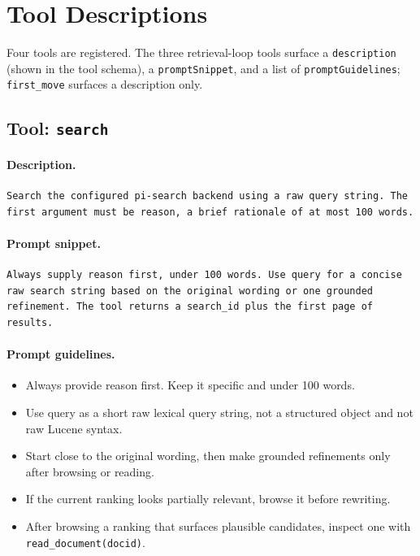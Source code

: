 \section{Tool Descriptions}
\label{sec:tool-descriptions}

Four tools are registered. The three retrieval-loop tools surface a
\texttt{description} (shown in the tool schema), a \texttt{promptSnippet}, and a
list of \texttt{promptGuidelines}; \texttt{first\_move} surfaces a description
only.

\subsection{Tool: {\tt search}}
\label{tool:search}

\paragraph{Description.}
\begin{verbatim}
Search the configured pi-search backend using a raw query string. The
first argument must be reason, a brief rationale of at most 100 words.
\end{verbatim}

\paragraph{Prompt snippet.}
\begin{verbatim}
Always supply reason first, under 100 words. Use query for a concise
raw search string based on the original wording or one grounded
refinement. The tool returns a search_id plus the first page of
results.
\end{verbatim}

\paragraph{Prompt guidelines.}
\begin{itemize}
  \item Always provide reason first. Keep it specific and under 100 words.
  \item Use query as a short raw lexical query string, not a structured object and not raw Lucene syntax.
  \item Start close to the original wording, then make grounded refinements only after browsing or reading.
  \item If the current ranking looks partially relevant, browse it before rewriting.
  \item After browsing a ranking that surfaces plausible candidates, inspect one with \texttt{read\_document(docid)}.
\end{itemize}


